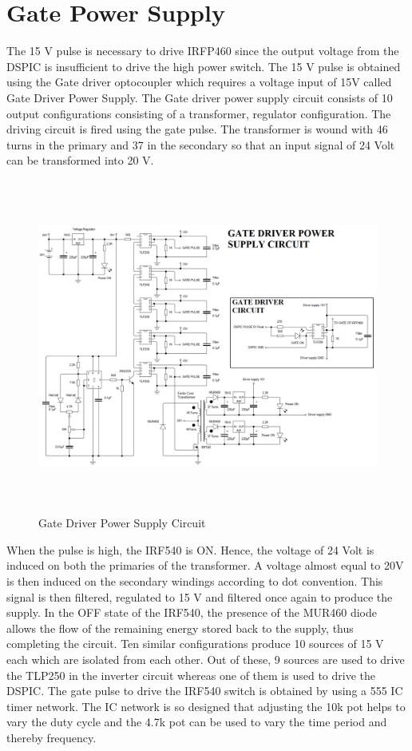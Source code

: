 \documentclass[12pt,a4paper]{report}
\begin{document}
\section{Gate Power Supply}

The 15 V pulse is necessary to drive IRFP460 since the output voltage from the DSPIC is insufficient to drive the high power switch. The 15 V pulse is obtained using the Gate driver optocoupler which requires a voltage input of 15V called Gate Driver Power Supply. The Gate driver power supply circuit consists of 10 output configurations consisting of a transformer, regulator configuration. The driving circuit is fired using the gate pulse. The transformer is wound with 46 turns in the primary and 37 in the secondary so that an input signal of 24 Volt can be transformed into 20 V.\\

\begin{figure}[H]
	\begin{center}
		\includegraphics[width=16cm,height=11cm]{figures/overall.png}
	\end{center}
	\caption{Gate Driver Power Supply Circuit}
\end{figure}

 When the pulse is high, the IRF540 is ON. Hence, the voltage of 24 Volt is induced on both the primaries of the transformer. A voltage almost equal to 20V is then induced on the secondary windings according to dot convention. This signal is then filtered, regulated to 15 V and filtered once again to produce the supply. In the OFF state of the IRF540, the presence of the MUR460 diode allows the flow of the remaining energy stored back to the supply, thus completing the circuit. Ten similar configurations produce 10 sources of 15 V each which are isolated from each other. Out of these, 9 sources are used to drive the TLP250 in the inverter circuit whereas one of them is used to drive the DSPIC. The gate pulse to drive the IRF540 switch is obtained by using a 555 IC timer network. The IC network is so designed that adjusting the 10k pot helps to vary the duty cycle and the 4.7k pot can be used to vary the time period and thereby frequency.\\
\end{document}

